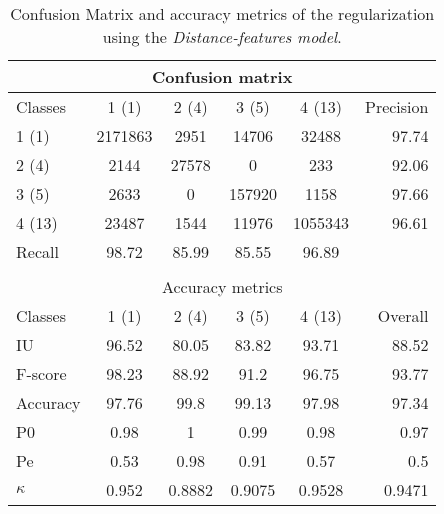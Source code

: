 \begin{table}[H]
\begin{center}
\footnotesize
\begin{tabular}{|l|c|c|c|c|r|}
\hline
\multicolumn{6}{|c|}{Confusion matrix} \\
\hline
 Classes & 1 (1) & 2 (4) & 3 (5) & 4 (13) & Precision \\
\hline
1 (1) & 2171863 & 2951 & 14706 & 32488 & 97.74 \\
\hline
2 (4) & 2144 & 27578 & 0 & 233 & 92.06 \\
\hline
3 (5) & 2633 & 0 & 157920 & 1158 & 97.66 \\
\hline
4 (13) & 23487 & 1544 & 11976 & 1055343 & 96.61 \\
\hline
Recall & 98.72 & 85.99 & 85.55 & 96.89 &  \\
\hline
\multicolumn{6}{c}{ } \\
\hline
\multicolumn{6}{|c|}{Accuracy metrics} \\
\hline
 Classes & 1 (1) & 2 (4) & 3 (5) & 4 (13) & Overall \\
\hline
IU & 96.52 & 80.05 & 83.82 & 93.71 & 88.52 \\
\hline
F-score & 98.23 & 88.92 & 91.2 & 96.75 & 93.77 \\
\hline
Accuracy & 97.76 & 99.8 & 99.13 & 97.98 & 97.34 \\
\hline
P0 & 0.98 & 1 & 0.99 & 0.98 & 0.97 \\
\hline
Pe & 0.53 & 0.98 & 0.91 & 0.57 & 0.5 \\
\hline
$\kappa$ & 0.952 & 0.8882 & 0.9075 & 0.9528 & 0.9471 \\
\hline
\end{tabular}
\caption{Confusion Matrix and accuracy metrics of the regularization  using the \textit{Distance-features model}.}
\label{table:}
\end{center}
\end{table}
